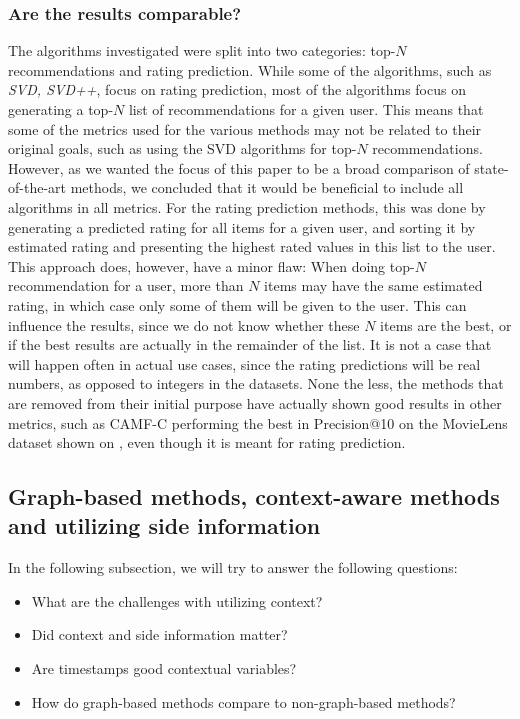 \subsubsection{Are the results comparable?}
The algorithms investigated were split into two categories: top-$N$ recommendations and rating prediction.
While some of the algorithms, such as \textit{SVD, SVD++}, focus on rating prediction, most of the algorithms focus on generating a top-$N$ list of recommendations for a given user.
This means that some of the metrics used for the various methods may not be related to their original goals, such as using the SVD algorithms for top-$N$ recommendations.
However, as we wanted the focus of this paper to be a broad comparison of state-of-the-art methods, we concluded that it would be beneficial to include all algorithms in all metrics.
For the rating prediction methods, this was done by generating a predicted rating for all items for a given user, and sorting it by estimated rating and presenting the highest rated values in this list to the user.
This approach does, however, have a minor flaw: When doing top-$N$ recommendation for a user, more than $N$ items may have the same estimated rating, in which case only some of them will be given to the user.
This can influence the results, since we do not know whether these $N$ items are the best, or if the best results are actually in the remainder of the list.
It is not a case that will happen often in actual use cases, since the rating predictions will be real numbers, as opposed to integers in the datasets.
None the less, the methods that are removed from their initial purpose have actually shown good results in other metrics, such as CAMF-C performing the best in Precision@10 on the MovieLens dataset shown on , even though it is meant for rating prediction.

\subsection{Graph-based methods, context-aware methods and utilizing side information}
In the following subsection, we will try to answer the following questions: 
\begin{itemize}
    \item What are the challenges with utilizing context?
    \item Did context and side information matter?
    \item Are timestamps good contextual variables?
    \item How do graph-based methods compare to non-graph-based methods?
\end{itemize}

